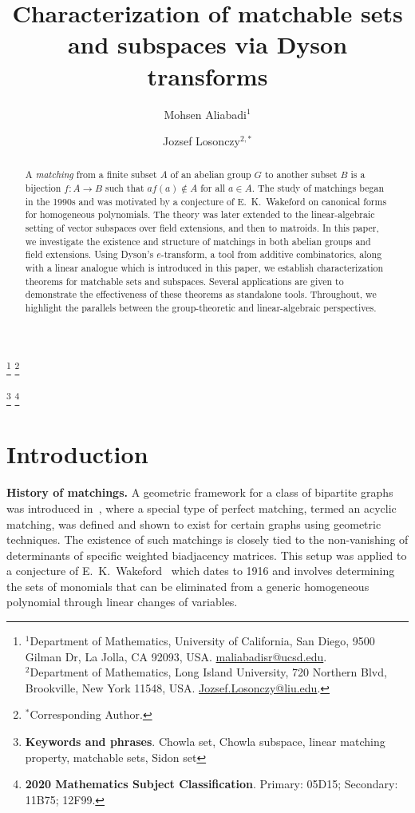 \documentclass[11pt]{amsart}
\theoremstyle{definition}
\theoremstyle{remark}
\begin{document}
\title[Characterization of matchable sets and subspaces]{Characterization of matchable sets and subspaces via Dyson transforms}


\author[M. Aliabadi, J. Losonczy]{Mohsen Aliabadi$^{1}$ \and Jozsef Losonczy$^{2,*}$}
\thanks{$^1$Department of Mathematics, University of California, San Diego, 
9500 Gilman Dr, La Jolla, CA 92093, USA.  \url{maliabadisr@ucsd.edu}.\\
$^2$Department of Mathematics, Long Island University,
720 Northern Blvd, Brookville, New York 11548, USA. \url{Jozsef.Losonczy@liu.edu}.}
\thanks{$^*$Corresponding Author.}

\thanks{\textbf{Keywords and phrases}. Chowla set, Chowla subspace, linear matching property, matchable sets, Sidon set}
\thanks{\textbf{2020 Mathematics Subject Classification}. Primary: 05D15; Secondary: 11B75; 12F99. }




\begin{abstract}
A \emph{matching} from a finite subset \( A \) of an abelian group \( G \) to another subset \( B \) is a bijection \( f : A \to B \) such that \( af(a) \notin A \) for all \( a \in A \). The study of matchings began in the 1990s and was motivated by a conjecture of E.~K.~Wakeford on canonical forms for homogeneous polynomials. The theory was later extended to the linear-algebraic setting of vector subspaces over field extensions, and then to matroids. In this paper, we investigate the existence and structure of matchings in both abelian groups and field extensions. Using Dyson's \( e \)-transform, a tool from additive combinatorics, along with a linear analogue which is introduced in this paper, we establish characterization theorems for matchable sets and subspaces.  Several applications are given to demonstrate the effectiveness of these theorems as standalone tools. Throughout, we highlight the parallels between the group-theoretic and linear-algebraic perspectives.
\end{abstract}

\maketitle




\section{Introduction}

\textbf{History of matchings.} A geometric framework for a class of bipartite graphs was introduced in~\cite{Losonczy 1}, where a special type of perfect matching, termed an acyclic matching, was defined and shown to exist for certain graphs using geometric techniques. The existence of such matchings is closely tied to the non-vanishing of determinants of specific weighted biadjacency matrices. This setup was applied to a conjecture of E.~K.~Wakeford~\cite{Wakeford} which dates to 1916 and involves determining the sets of monomials that can be eliminated from a generic homogeneous polynomial through linear changes of variables.
\end{document}
